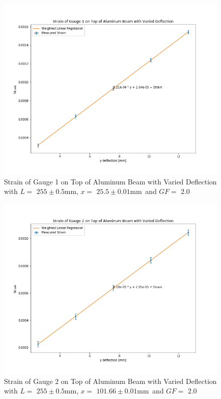 \documentclass[]{article}
\newcommand{\xOne}{\ensuremath{25.5 \pm 0.01 \si{\milli\meter}}}
\newcommand{\xTwo}{\ensuremath{101.66 \pm 0.01 \si{\milli\meter}}}
\newcommand{\GF}{\ensuremath{2.0}}
\newcommand{\LOne}{\ensuremath{255 \pm 0.5 \si{\milli\meter}}}
\begin{document}
\newpage
\begin{figure}[hp]
    \includegraphics[width=\textwidth]{../output/graph/gauge1Strain.png}
    \caption{Strain of Gauge 1 on Top of Aluminum Beam with Varied Deflection
    with $L=$ \LOne, $x=$ \xOne\ and $GF=$ \GF}\label{fig:gauge1}
\end{figure}

\newpage
\begin{figure}[hp]
    \includegraphics[width=\textwidth]{../output/graph/gauge2Strain.png}
    \caption{Strain of Gauge 2 on Top of Aluminum Beam with Varied Deflection
    with $L=$ \LOne, $x=$ \xTwo\ and $GF=$ \GF}\label{fig:gauge2}
\end{figure}
\end{document}
